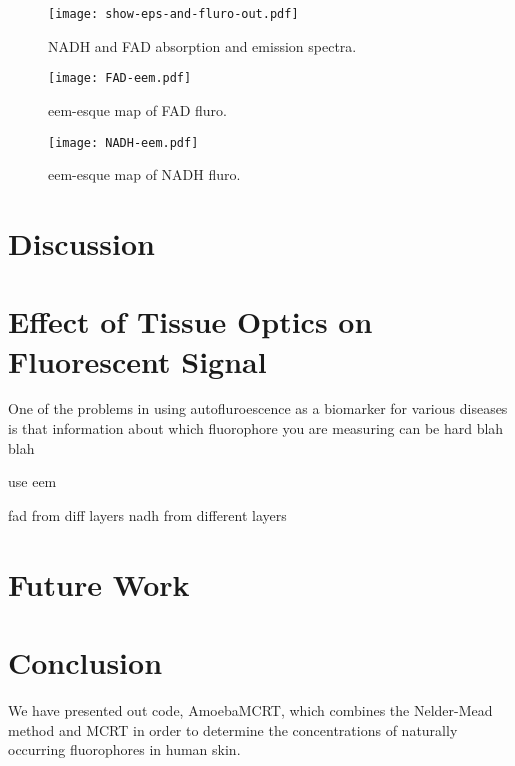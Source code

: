 \begin{figure}[!htpb]
    \centering
    \texttt{[image: show-eps-and-fluro-out.pdf]}
    \caption{NADH and FAD absorption and emission spectra.}
    \label{fig:epsfluro}
\end{figure}

\begin{figure}[!htpb]
    \centering
    \texttt{[image: FAD-eem.pdf]}
    \caption{eem-esque map of FAD fluro.}
    \label{fig:fadeem}
\end{figure}

\begin{figure}[!htpb]
    \centering
    \texttt{[image: NADH-eem.pdf]}
    \caption{eem-esque map of NADH fluro.}
    \label{fig:nadheem}
\end{figure}

\section{Discussion}

\section{Effect of Tissue Optics on Fluorescent Signal}

One of the problems in using autofluroescence as a biomarker for various diseases is that information about which fluorophore you are measuring can be hard blah blah

use eem

fad from diff layers
nadh from different layers


\section{Future Work}

\section{Conclusion}

We have presented out code, AmoebaMCRT, which combines the Nelder-Mead method and MCRT in order to determine the concentrations of naturally occurring fluorophores in human skin.



